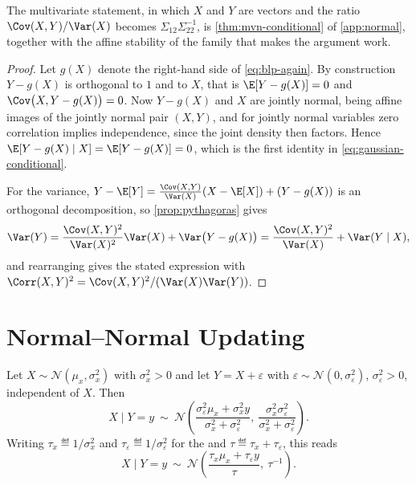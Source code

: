The multivariate statement, in which $X$ and $Y$ are vectors and the ratio
$\Cov(X,Y)/\Var(X)$ becomes $\Sigma_{12}\Sigma_{22}^{-1}$, is
\autoref{thm:mvn-conditional} of \autoref{app:normal}, together with the affine
stability of the family that makes the argument work.

\begin{proof}
	Let $g(X)$ denote the right-hand side of \eqref{eq:blp-again}. By construction
	$Y-g(X)$ is orthogonal to $1$ and to $X$, that is $\E[Y-g(X)]=0$ and
	$\Cov\bigl(X,Y-g(X)\bigr)=0$. Now $Y-g(X)$ and $X$ are jointly normal, being
	affine images of the jointly normal pair $(X,Y)$, and for jointly normal
	variables zero correlation implies independence, since the joint density then
	factors. Hence
	$\E[Y-g(X)\mid X]=\E[Y-g(X)]=0$, which is the first identity in
	\eqref{eq:gaussian-conditional}.

	For the variance, $Y-\E[Y]=\frac{\Cov(X,Y)}{\Var(X)}(X-\E[X])+(Y-g(X))$ is an
	orthogonal decomposition, so \autoref{prop:pythagoras} gives
	\[
		\Var(Y)=\frac{\Cov(X,Y)^{2}}{\Var(X)^{2}}\Var(X)+\Var\bigl(Y-g(X)\bigr)
		=\frac{\Cov(X,Y)^{2}}{\Var(X)}+\Var(Y\mid X),
	\]
	and rearranging gives the stated expression with
	$\Corr(X,Y)^{2}=\Cov(X,Y)^{2}/(\Var(X)\Var(Y))$.
\end{proof}

\section{Normal--Normal Updating}\label{sec:prob-normal}

\begin{theorem}\label{thm:normal-updating}
	Let $X\sim\mathcal{N}(\mu_x,\sigma_x^{2})$ with $\sigma_x^2>0$ and let
	$Y=X+\varepsilon$ with $\varepsilon\sim\mathcal{N}(0,\sigma_\varepsilon^{2})$,
	$\sigma_\varepsilon^2>0$, independent of $X$. Then
	\begin{equation}\label{eq:normal-updating}
		X\mid Y=y\ \sim\
		\mathcal{N}\!\left(
		\frac{\sigma_\varepsilon^{2}\mu_x+\sigma_x^{2}y}
		{\sigma_x^{2}+\sigma_\varepsilon^{2}},\
		\frac{\sigma_x^{2}\sigma_\varepsilon^{2}}
		{\sigma_x^{2}+\sigma_\varepsilon^{2}}
		\right).
	\end{equation}
	Writing $\tau_x\eqdef1/\sigma_x^{2}$ and
	$\tau_\varepsilon\eqdef1/\sigma_\varepsilon^{2}$ for the 
	and $\tau\eqdef\tau_x+\tau_\varepsilon$, this reads
	\begin{equation}\label{eq:normal-updating-precision}
		X\mid Y=y\ \sim\
		\mathcal{N}\!\left(\frac{\tau_x\mu_x+\tau_\varepsilon y}{\tau},\ \tau^{-1}\right).
	\end{equation}
\end{theorem}

